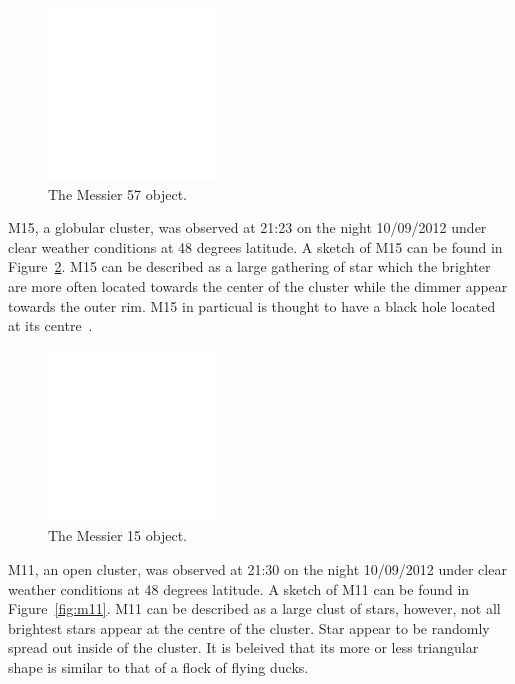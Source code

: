 \documentclass{article}
\begin{document}
\begin{figure}[h]
\centering
\includegraphics[width=0.4\textwidth]{images/blank}
\caption{The Messier 57 object.\label{fig:m57}}
\end{figure}

M15, a globular cluster, was observed at 21:23 on the night 10/09/2012 under clear weather conditions at 48 degrees latitude. A sketch
of M15 can be found in Figure~\ref{fig:m15}. M15 can be described as a large gathering of star which the brighter are more often 
located towards the center of the cluster while the dimmer appear towards the outer rim. M15 in particual is thought to have a 
black hole located at its centre~\cite{Marel:2003}.

\begin{figure}[h!]
\centering
\includegraphics[width=0.4\textwidth]{images/blank}
\caption{The Messier 15 object.\label{fig:m15}}
\end{figure}

M11, an open cluster, was observed at 21:30 on the night 10/09/2012 under clear weather conditions at 48 degrees latitude. A sketch
of M11 can be found in Figure~\ref{fig:m11}. M11 can be described as a large clust of stars, however, not all brightest stars appear
at the centre of the cluster. Star appear to be randomly spread out inside of the cluster. It is beleived that its more or less triangular
shape is similar to that of a flock of flying ducks.
\end{document}
